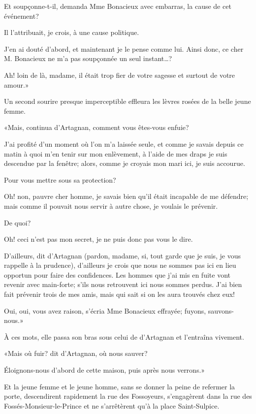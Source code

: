 \speak  Et soupçonne-t-il, demanda Mme Bonacieux avec embarras, la cause de cet événement? 

\speak  Il l'attribuait, je crois, à une cause politique. 

\speak  J'en ai douté d'abord, et maintenant je le pense comme lui. Ainsi donc, ce cher M. Bonacieux ne m'a pas soupçonnée un seul instant\dots? 

\speak  Ah! loin de là, madame, il était trop fier de votre sagesse et surtout de votre amour.» 

Un second sourire presque imperceptible effleura les lèvres rosées de la belle jeune femme. 

«Mais, continua d'Artagnan, comment vous êtes-vous enfuie? 

\speak  J'ai profité d'un moment où l'on m'a laissée seule, et comme je savais depuis ce matin à quoi m'en tenir sur mon enlèvement, à l'aide de mes draps je suis descendue par la fenêtre; alors, comme je croyais mon mari ici, je suis accourue. 

\speak  Pour vous mettre sous sa protection? 

\speak  Oh! non, pauvre cher homme, je savais bien qu'il était incapable de me défendre; mais comme il pouvait nous servir à autre chose, je voulais le prévenir. 

\speak  De quoi? 

\speak  Oh! ceci n'est pas mon secret, je ne puis donc pas vous le dire. 

\speak  D'ailleurs, dit d'Artagnan (pardon, madame, si, tout garde que je suis, je vous rappelle à la prudence), d'ailleurs je crois que nous ne sommes pas ici en lieu opportun pour faire des confidences. Les hommes que j'ai mis en fuite vont revenir avec main-forte; s'ils nous retrouvent ici nous sommes perdus. J'ai bien fait prévenir trois de mes amis, mais qui sait si on les aura trouvés chez eux! 

\speak  Oui, oui, vous avez raison, s'écria Mme Bonacieux effrayée; fuyons, sauvons-nous.» 

À ces mots, elle passa son bras sous celui de d'Artagnan et l'entraîna vivement. 

«Mais où fuir? dit d'Artagnan, où nous sauver? 

\speak  Éloignons-nous d'abord de cette maison, puis après nous verrons.» 

Et la jeune femme et le jeune homme, sans se donner la peine de refermer la porte, descendirent rapidement la rue des Fossoyeurs, s'engagèrent dans la rue des Fossés-Monsieur-le-Prince et ne s'arrêtèrent qu'à la place Saint-Sulpice. 

